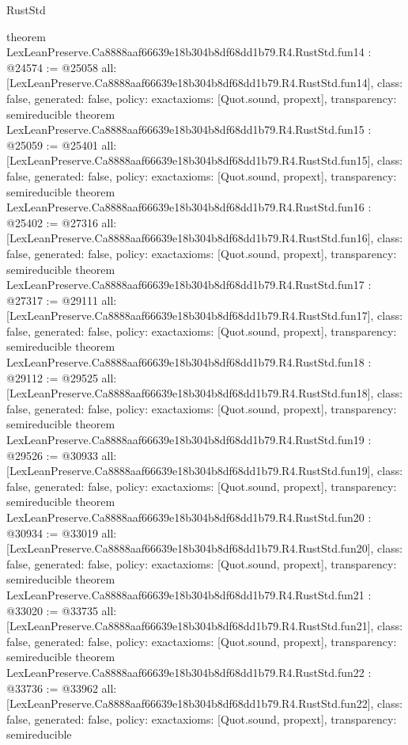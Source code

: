 \begin{lexlean}{RustStd}
\begin{coremodule}
{}
theorem LexLeanPreserve.Ca8888aaf66639e18b304b8df68dd1b79.R4.RustStd.fun14 : @24574 := @25058 {
  all: [LexLeanPreserve.Ca8888aaf66639e18b304b8df68dd1b79.R4.RustStd.fun14],
  class: false,
  generated: false,
  policy: exact{axioms: [Quot.sound, propext]},
  transparency: semireducible
}
theorem LexLeanPreserve.Ca8888aaf66639e18b304b8df68dd1b79.R4.RustStd.fun15 : @25059 := @25401 {
  all: [LexLeanPreserve.Ca8888aaf66639e18b304b8df68dd1b79.R4.RustStd.fun15],
  class: false,
  generated: false,
  policy: exact{axioms: [Quot.sound, propext]},
  transparency: semireducible
}
theorem LexLeanPreserve.Ca8888aaf66639e18b304b8df68dd1b79.R4.RustStd.fun16 : @25402 := @27316 {
  all: [LexLeanPreserve.Ca8888aaf66639e18b304b8df68dd1b79.R4.RustStd.fun16],
  class: false,
  generated: false,
  policy: exact{axioms: [Quot.sound, propext]},
  transparency: semireducible
}
theorem LexLeanPreserve.Ca8888aaf66639e18b304b8df68dd1b79.R4.RustStd.fun17 : @27317 := @29111 {
  all: [LexLeanPreserve.Ca8888aaf66639e18b304b8df68dd1b79.R4.RustStd.fun17],
  class: false,
  generated: false,
  policy: exact{axioms: [Quot.sound, propext]},
  transparency: semireducible
}
theorem LexLeanPreserve.Ca8888aaf66639e18b304b8df68dd1b79.R4.RustStd.fun18 : @29112 := @29525 {
  all: [LexLeanPreserve.Ca8888aaf66639e18b304b8df68dd1b79.R4.RustStd.fun18],
  class: false,
  generated: false,
  policy: exact{axioms: [Quot.sound, propext]},
  transparency: semireducible
}
theorem LexLeanPreserve.Ca8888aaf66639e18b304b8df68dd1b79.R4.RustStd.fun19 : @29526 := @30933 {
  all: [LexLeanPreserve.Ca8888aaf66639e18b304b8df68dd1b79.R4.RustStd.fun19],
  class: false,
  generated: false,
  policy: exact{axioms: [Quot.sound, propext]},
  transparency: semireducible
}
theorem LexLeanPreserve.Ca8888aaf66639e18b304b8df68dd1b79.R4.RustStd.fun20 : @30934 := @33019 {
  all: [LexLeanPreserve.Ca8888aaf66639e18b304b8df68dd1b79.R4.RustStd.fun20],
  class: false,
  generated: false,
  policy: exact{axioms: [Quot.sound, propext]},
  transparency: semireducible
}
theorem LexLeanPreserve.Ca8888aaf66639e18b304b8df68dd1b79.R4.RustStd.fun21 : @33020 := @33735 {
  all: [LexLeanPreserve.Ca8888aaf66639e18b304b8df68dd1b79.R4.RustStd.fun21],
  class: false,
  generated: false,
  policy: exact{axioms: [Quot.sound, propext]},
  transparency: semireducible
}
theorem LexLeanPreserve.Ca8888aaf66639e18b304b8df68dd1b79.R4.RustStd.fun22 : @33736 := @33962 {
  all: [LexLeanPreserve.Ca8888aaf66639e18b304b8df68dd1b79.R4.RustStd.fun22],
  class: false,
  generated: false,
  policy: exact{axioms: [Quot.sound, propext]},
  transparency: semireducible
}
\end{coremodule}
\end{lexlean}
